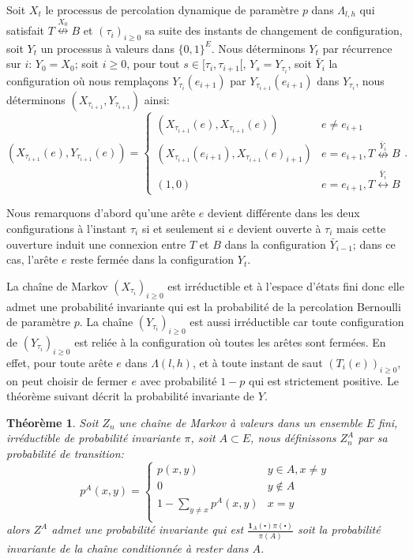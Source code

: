 \documentclass[titlepage,a4paper,12pt]{article}
\newcounter{thm}
\newtheorem{probainv}[thm]{Théorème}
\begin{document}
Soit $X_t$ le processus de percolation dynamique de paramètre $p$ dans $\Lambda_{l,h}$ qui satisfait $T\overset{X_0}{\nleftrightarrow}B$ et $(\tau_i)_{i\geqslant 0}$ sa suite des instants de changement de configuration, soit $Y_t$ un processus à valeurs dans $\{0,1\}^E$. Nous déterminons $Y_t$ par récurrence sur $i$: $Y_0=X_0$; soit $i\geqslant 0$, pour tout $s\in [\tau_i, \tau_{i+1}[$, $Y_s = Y_{\tau_i}$, soit $\bar{Y}_i$ la configuration où nous remplaçons $Y_{\tau_i}(e_{i+1})$ par $Y_{\tau_{i+1}}(e_{i+1})$ dans $Y_{\tau_i}$, nous déterminons $(X_{\tau_{i+1}},Y_{\tau_{i+1}})$ ainsi:
$$(X_{\tau_{i+1}}(e),Y_{\tau_{i+1}}(e))=\left\lbrace \begin{array}{cc}
(X_{\tau_{i+1}}(e),X_{\tau_{i+1}}(e)) & e \neq e_{i+1}\\
(X_{\tau_{i+1}}(e_{i+1}),X_{\tau_{i+1}}(e)_{i+1}) & e = e_{i+1}, T \overset{\bar{Y}_i}{\nleftrightarrow} B \\
(1,0) & e = e_{i+1},T\overset{\bar{Y}_i}{\leftrightarrow} B 
\end{array}\right..$$

Nous remarquons d'abord qu'une arête $e$ devient différente dans les deux configurations à l'instant $\tau_i$ si et seulement si $e$ devient ouverte à $\tau_i$ mais cette ouverture induit une connexion entre $T$ et $B$ dans la configuration $\bar{Y}_{i-1}$; dans ce cas, l'arête $e$ reste fermée dans la configuration $Y_t$. 

La chaîne de Markov $(X_{\tau_i})_{i\geqslant 0}$ est irréductible et à l'espace d'états fini donc elle admet une probabilité invariante qui est la probabilité de la percolation Bernoulli de paramètre $p$. La chaîne $(Y_{\tau_i})_{i\geqslant 0}$ est aussi irréductible car toute configuration de $(Y_{\tau_i})_{i\geqslant 0}$ est reliée à la configuration où toutes les arêtes sont fermées. En effet, pour toute arête $e$ dans $\Lambda(l,h)$, et à toute instant de saut $(T_i(e))_{i\geqslant 0}$, on peut choisir de fermer $e$ avec probabilité $1-p$ qui est strictement positive. Le théorème suivant décrit la probabilité invariante de $Y$.

\begin{probainv}
Soit $Z_n$ une chaîne de Markov à valeurs dans un ensemble $E$ fini, irréductible de probabilité invariante $\pi$, soit $A\subset E$, nous définissons $Z_n^A$ par sa probabilité de transition:
$$p^A(x,y)=\left\lbrace \begin{array}{cc}
p(x,y) & y\in A, x\neq y \\
0 & y\notin A \\
1-\sum_{y\neq x}p^A(x,y) & x = y\\
\end{array}
\right.
$$
alors $Z^A$ admet une probabilité invariante qui est $\frac{\mathbf{1}_A(\centerdot)\pi(\centerdot)}{\pi(A)}$ soit la probabilité invariante de la chaîne conditionnée à rester dans $A$.
\end{probainv}
\end{document}
